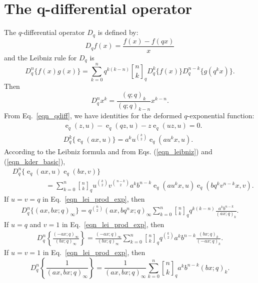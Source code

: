 \documentclass{cimart}
\newcommand{\qbinom}{\genfrac{[}{]}{0pt}{}}
\DeclareMathOperator{\ope}{e}
\begin{document}
\section{The q-differential operator}
The $q$-differential operator $D_{q}$ is defined by:
\begin{equation}\label{eqn_qdiff}
    D_{q}f(x)=\frac{f(x)-f(qx)}{x}
\end{equation}
and the Leibniz rule for $D_{q}$ is
\begin{equation}\label{eqn_leibniz}
    D_{q}^{n}\{f(x)g(x)\}=\sum_{k=0}^{n}q^{k(k-n)}\qbinom{n}{k}_{q}D_{q}^{k}\{f(x)\}D_{q}^{n-k}\{g(q^{k}x)\}.
\end{equation}
Then
\begin{equation*}
    D_{q}^nx^{k}=\frac{(q;q)_{k}}{(q;q)_{k-n}}x^{k-n}.
\end{equation*}
From Eq.~\eqref{eqn_qdiff}, we have identities for the deformed $q$-exponential function:
\begin{align}\label{eqn_kder_basic}
&\ope_{q}(z,u)-\ope_{q}(qz,u)-z\ope_{q}(uz,u)=0.\\
 &D_{q}^{k}\{\ope_{q}(ax,u)\}=a^{k}u^{\binom{k}{2}}\ope_{q}(au^{k}x,u).
\end{align}
According to the Leibniz formula and from Eqs. (\ref{eqn_leibniz}) and (\ref{eqn_kder_basic}),
\begin{align}\label{eqn_lei_prod_exp}
    &D_{q}^{n}\{\ope_{q}(ax,u)\ope_{q}(bx,v)\}\nonumber
    \\
    &\hspace{2cm}=\sum_{k=0}^{n}\qbinom{n}{k}_{q}u^{\binom{k}{2}}v^{\binom{n-k}{2}}a^kb^{n-k}
    \ope_{q}\left(au^{k}x,u\right)\ope_{q}\left(bq^{k}v^{n-k}x,v\right).
\end{align}
If $u=v=q$ in Eq.~\eqref{eqn_lei_prod_exp}, then
    \begin{align}\label{eqn_iden6}
        D_{q}^{n}\{(ax,bx;q)_{\infty}\}=q^{\binom{n}{2}}(ax,bq^nx;q)_{\infty}\sum_{k=0}^{n}\qbinom{n}{k}_{q}q^{k(k-n)}\frac{a^kb^{n-k}}{(ax;q)_{k}}.
    \end{align}
If $u=q$ and $v=1$ in Eq.~\eqref{eqn_lei_prod_exp}, then
    \begin{align}\label{eqn_iden7}
        D_{q}^{n}\left\{\frac{(-ax;q)_{\infty}}{(bx;q)_{\infty}}\right\}=\frac{(-ax;q)_{\infty}}{(bx;q)_{\infty}}\sum_{k=0}^{n}\qbinom{n}{k}_{q}q^{\binom{k}{2}}a^kb^{n-k}\frac{(bx;q)_{k}}{(-ax;q)_{k}}.
    \end{align}
If $u=v=1$ in Eq.~\eqref{eqn_lei_prod_exp}, then
    \begin{equation}\label{eqn_iden8}
        D_{q}^{n}\left\{\frac{1}{(ax,bx;q)_{\infty}}\right\}
        =\frac{1}{(ax,bx;q)_{\infty}}\sum_{k=0}^{n}\qbinom{n}{k}_{q}a^kb^{n-k}(bx;q)_{k}.
    \end{equation}
\end{document}
